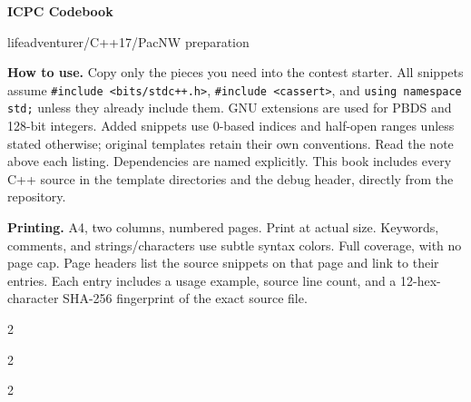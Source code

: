 \documentclass[10pt,a4paper]{article}
\begin{document}
\fontsize{9}{10.5}\selectfont
\begin{center}
  {\LARGE\sffamily\bfseries ICPC Codebook}\par
  {\normalsize\sffamily lifeadventurer\quad /\quad C++17\quad /\quad PacNW preparation}
\end{center}
\textbf{How to use.} Copy only the pieces you need into the contest starter.
All snippets assume \texttt{\#include <bits/stdc++.h>}, \texttt{\#include <cassert>}, and
\texttt{using namespace std;} unless they already include them.
GNU extensions are used for PBDS and 128-bit integers. Added snippets use
0-based indices and half-open ranges unless stated otherwise; original
templates retain their own conventions. Read the note above each listing.
Dependencies are named explicitly. This book includes every C++ source in
the template directories and the debug header, directly from the repository.
\par
\textbf{Printing.} A4, two columns, numbered pages. Print at actual size.
\textcolor{codeblue}{Keywords}, \textcolor{codered}{comments}, and
\textcolor{codegreen}{strings/characters} use subtle syntax colors.
Full coverage, with no page cap.
Page headers list the source snippets on that page and link to their entries.
Each entry includes a usage example, source line count, and a 12-hex-character SHA-256
fingerprint of the exact source file.
\begin{multicols}{2}
\tableofcontents
\end{multicols}
\clearpage
\begin{multicols*}{2}
\raggedcolumns

\end{multicols*}
\clearpage
\begin{multicols}{2}
\raggedcolumns


\end{multicols}
\end{document}
